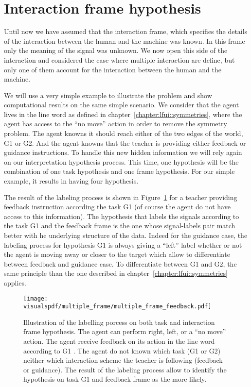 
\section{Interaction frame hypothesis}
\label{chapter:limitations:framehypothesis}


Until now we have assumed that the interaction frame, which specifies the details of the interaction between the human and the machine was known. In this frame only the meaning of the signal was unknown. We now open this side of the interaction and considered the case where multiple interaction are define, but only one of them account for the interaction between the human and the machine.

We will use a very simple example to illustrate the problem and show computational results on the same simple scenario. We consider that the agent lives in the line word as defined in chapter~\ref{chapter:lfui::symmetries}, where the agent has access to the ``no move'' action in order to remove the symmetry problem. The agent knowns it should reach either of the two edges of the world, G1 or G2. And the agent knowns that the teacher is providing either feedback or guidance instructions. To handle this new hidden information we will rely again on our interpretation hypothesis process. This time, one hypothesis will be the combination of one task hypothesis and one frame hypothesis.  For our simple example, it results in having four hypothesis.

The result of the labeling process is shown in Figure~\ref{fig:multipleframeexplainedfeedback} for a teacher providing feedback instruction according the task G1 (of course the agent do not have access to this information). The hypothesis that labels the signals according to the task G1 and the feedback frame is the one whose signal-labels pair match better with he underlying structure of the data. Indeed for the guidance case, the labeling process for hypothesis G1 is always giving a ``left'' label whether or not the agent is moving away or closer to the target which allow to differentiate between feedback and guidance case. To differentiate between G1 and G2, the same principle than the one described in chapter~\ref{chapter:lfui::symmetries} applies.

\begin{figure}[!ht]
\centering
\texttt{[image: \\visualspdf/multiple\_frame/multiple\_frame\_feedback.pdf]}
\caption{Illustration of the labelling porcess on both task and interaction frame hypothesis. The agent can perform right, left, or a ``no move'' action. The agent receive feedback on its action in the line word according to G1 . The agent do not known which task (G1 or G2) neither which interaction scheme the teacher is following (feedback or guidance). The result of the labeling process allow to identify the hypothesis on task G1 and feedback frame as the more likely.}
\label{fig:multipleframeexplainedfeedback}
\end{figure} 

